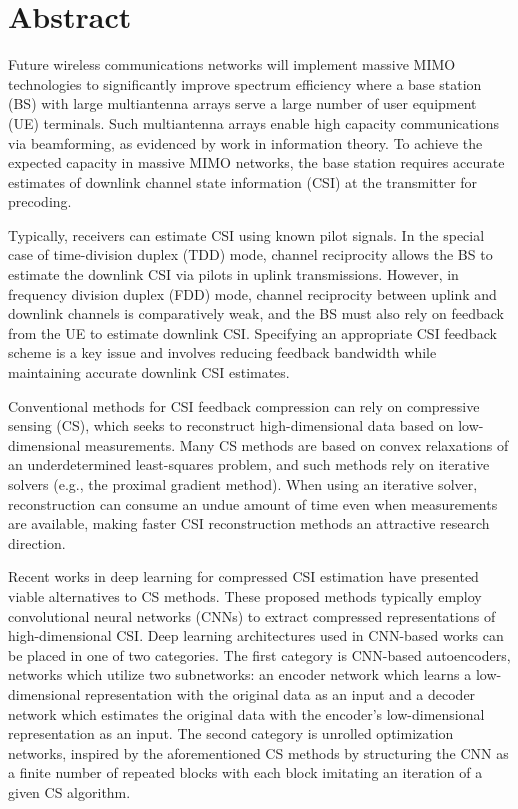 \newpage
\chapter*{\centering Abstract}

Future wireless communications networks will implement massive MIMO technologies to significantly improve spectrum efficiency where a base station (BS) with large multiantenna arrays serve a large number of user equipment (UE) terminals. Such multiantenna arrays enable high capacity communications via beamforming, as evidenced by work in information theory. To achieve the expected capacity in massive MIMO networks, the base station requires accurate estimates of downlink channel state information (CSI) at the transmitter for precoding.

Typically, receivers can estimate CSI using known pilot signals. In the special case of time-division duplex (TDD) mode, channel reciprocity allows the BS to estimate the downlink CSI via pilots in uplink transmissions. However, in frequency division duplex (FDD) mode, channel reciprocity between uplink and downlink channels is comparatively weak, and the BS must also rely on feedback from the UE to estimate downlink CSI. Specifying an appropriate CSI feedback scheme is a key issue and involves reducing feedback bandwidth while maintaining accurate downlink CSI estimates.

Conventional methods for CSI feedback compression can rely on compressive sensing (CS), which seeks to reconstruct high-dimensional data based on low-dimensional measurements. Many CS methods are based on convex relaxations of an underdetermined least-squares problem, and such methods rely on iterative solvers (e.g., the proximal gradient method). When using an iterative solver, reconstruction can consume an undue amount of time even when measurements are available, making faster CSI reconstruction methods an attractive research direction.

Recent works in deep learning for compressed CSI estimation have presented viable alternatives to CS methods. These proposed methods typically employ convolutional neural networks (CNNs) to extract compressed representations of high-dimensional CSI. Deep learning architectures used in CNN-based works can be placed in one of two categories. The first category is CNN-based autoencoders, networks which utilize two subnetworks: an encoder network which learns a low-dimensional representation with the original data as an input and a decoder network which estimates the original data with the encoder's low-dimensional representation as an input. The second category is unrolled optimization networks, inspired by the aforementioned CS methods by structuring the CNN as a finite number of repeated blocks with each block imitating an iteration of a given CS algorithm.

